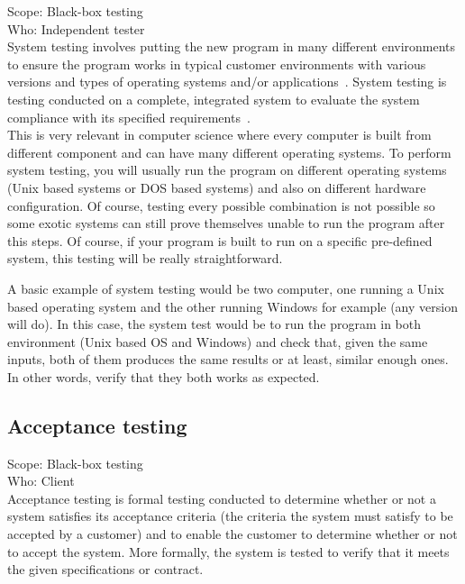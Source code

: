 \documentclass[12pt]{article}
\theoremstyle{definition}
\theoremstyle{definition}
\theoremstyle{remark}
\begin{document}
Scope: Black-box testing\\
Who: Independent tester\\

System testing involves putting the new program in many different environments to ensure the program works in typical customer environments with various versions and types of operating systems and/or applications~\cite{Laurie.W:Black-box}. System testing is testing conducted on a complete, integrated system to evaluate the system compliance with its specified requirements~\cite{IEEEStd1990}.\\

This is very relevant in computer science where every computer is built from different component and can have many different operating systems. To perform system testing, you will usually run the program on different operating systems (Unix based systems or DOS based systems) and also on different hardware configuration. Of course, testing every possible combination is not possible so some exotic systems can still prove themselves unable to run the program after this steps. Of course, if your program is built to run on a specific pre-defined system, this testing will be really straightforward.

A basic example of system testing would be two computer, one running a Unix based operating system and the other running Windows for example (any version will do). In this case, the system test would be to run the program in both environment (Unix based OS and Windows) and check that, given the same inputs, both of them produces the same results or at least, similar enough ones. In other words, verify that they both works as expected.


\subsection{Acceptance testing}

Scope: Black-box testing\\
Who: Client\\

Acceptance testing is formal testing conducted to determine whether or not a system satisfies its acceptance criteria (the criteria the system must satisfy to be accepted by a customer) and to enable the customer to determine whether or not to accept the system. More formally, the system is tested to verify that it meets the given specifications or contract.\\
\end{document}
